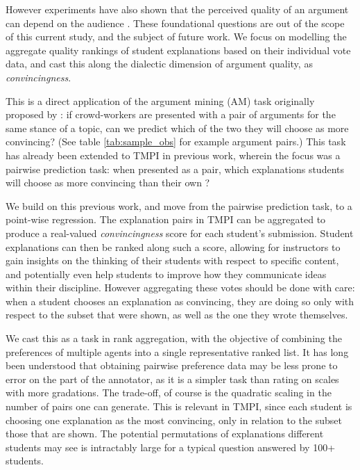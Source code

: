 \documentclass[notitlepage,12pt]{jedm}
\begin{document}
However experiments have also shown that the perceived quality of an argument 
can depend on the audience \cite{mercier_why_2011}. 
These foundational questions are out of the scope of this current study, and 
the subject of future work. 
We focus on modelling the aggregate quality rankings of student explanations 
based on their individual vote data, and cast this along the dialectic 
dimension of argument quality, as \textit{convincingness}.

This is a direct application of the argument mining (AM) task originally 
proposed by : if crowd-workers are presented with a 
pair of arguments for the same stance of a topic, can we predict 
which of the two they will choose as more convincing? 
(See table \ref{tab:sample_obs} for example argument pairs.)
This task has already been extended to TMPI in previous work, wherein the focus 
was a pairwise prediction task: when presented as a pair, which explanations 
students will choose as more convincing than their own 
\cite{bhatnagar_learnersourcing_2020}?

We build on this previous work, and move from the pairwise prediction task, to 
a point-wise regression. 
The explanation pairs in TMPI can be aggregated to produce a real-valued 
\textit{convincingness} score for each student's submission. 
Student explanations can then be ranked along such a score, allowing for 
instructors to gain insights on the thinking of their students with respect to 
specific content, and potentially even help students to improve how they 
communicate ideas within their discipline.
However aggregating these votes should be done with care: when a student 
chooses an explanation as convincing, they are doing so only with respect to 
the subset that were shown, as well as the one they wrote themselves.

We cast this as a task in rank aggregation, with the objective of combining the 
preferences of multiple agents into a single representative ranked list.
It has long been understood that obtaining pairwise preference data may be 
less prone to error on the part of the annotator, as it is a simpler task than 
rating on scales with more gradations.
The trade-off, of course is the quadratic scaling in the number of pairs one 
can generate. 
This is relevant in TMPI, since each student is choosing one explanation as 
the most convincing, only in relation to the subset those that are shown. 
The potential permutations of explanations different students may see is 
intractably large for a typical question answered by 100+ students.
\end{document}
